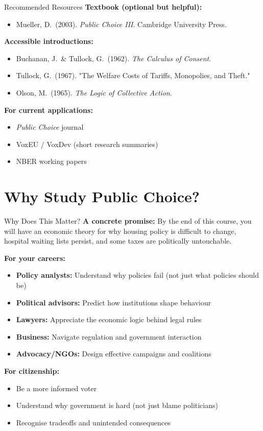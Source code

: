 \documentclass[10pt]{beamer}
\begin{document}
\begin{frame}{Recommended Resources}
\textbf{Textbook (optional but helpful):}
\begin{itemize}
\item Mueller, D.\ (2003). \textit{Public Choice III}. Cambridge University Press.
\end{itemize}


\textbf{Accessible introductions:}
\begin{itemize}
\item Buchanan, J.\ \& Tullock, G.\ (1962). \textit{The Calculus of Consent}.
\item Tullock, G.\ (1967). "The Welfare Costs of Tariffs, Monopolies, and Theft."
\item Olson, M.\ (1965). \textit{The Logic of Collective Action}.
\end{itemize}


\textbf{For current applications:}
\begin{itemize}
\item \textit{Public Choice} journal
\item VoxEU / VoxDev (short research summaries)
\item NBER working papers
\end{itemize}

\end{frame}

\section{Why Study Public Choice?}

\begin{frame}{Why Does This Matter?}
\textbf{A concrete promise:} By the end of this course, you will have an economic theory for why housing policy is difficult to change, hospital waiting lists persist, and some taxes are politically untouchable.

\textbf{For your careers:}
\begin{itemize}
\item \textbf{Policy analysts:} Understand why policies fail (not just what policies should be)
\item \textbf{Political advisors:} Predict how institutions shape behaviour
\item \textbf{Lawyers:} Appreciate the economic logic behind legal rules
\item \textbf{Business:} Navigate regulation and government interaction
\item \textbf{Advocacy/NGOs:} Design effective campaigns and coalitions
\end{itemize}


\textbf{For citizenship:}
\begin{itemize}
\item Be a more informed voter
\item Understand why government is hard (not just blame politicians)
\item Recognise tradeoffs and unintended consequences
\end{itemize}
\end{frame}
\end{document}
